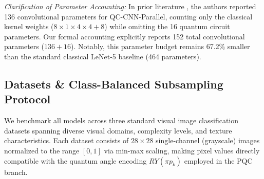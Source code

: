 \documentclass[journal]{IEEEtran}
\begin{document}
\textit{Clarification of Parameter Accounting:} In prior literature \cite{liu2026parallel}, the authors reported 136 convolutional parameters for QC-CNN-Parallel, counting only the classical kernel weights ($8 \times 1 \times 4 \times 4 + 8$) while omitting the 16 quantum circuit parameters. Our formal accounting explicitly reports 152 total convolutional parameters ($136 + 16$). Notably, this parameter budget remains 67.2\% smaller than the standard classical LeNet-5 baseline (464 parameters).

\subsection{Datasets \& Class-Balanced Subsampling Protocol}
We benchmark all models across three standard visual image classification datasets spanning diverse visual domains, complexity levels, and texture characteristics. Each dataset consists of $28 \times 28$ single-channel (grayscale) images normalized to the range $[0, 1]$ via min-max scaling, making pixel values directly compatible with the quantum angle encoding $RY(\pi p_k)$ employed in the PQC branch.
\end{document}
